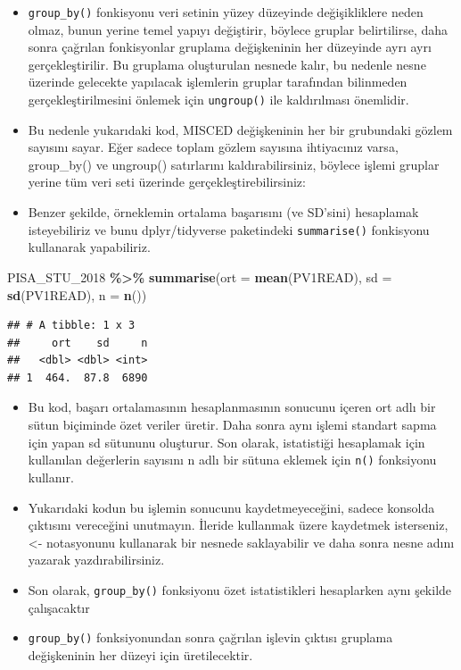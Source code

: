 \documentclass[
  oneside]{book}
\newenvironment{Shaded}{\begin{snugshade}}{\end{snugshade}}
\newcommand{\AttributeTok}[1]{\textcolor[rgb]{0.13,0.29,0.53}{#1}}
\newcommand{\FunctionTok}[1]{\textcolor[rgb]{0.13,0.29,0.53}{\textbf{#1}}}
\newcommand{\NormalTok}[1]{#1}
\newcommand{\SpecialCharTok}[1]{\textcolor[rgb]{0.81,0.36,0.00}{\textbf{#1}}}
\begin{document}
\begin{itemize}
\item
  \texttt{group\_by()} fonkisyonu veri setinin yüzey düzeyinde değişikliklere neden olmaz, bunun yerine temel yapıyı değiştirir, böylece gruplar belirtilirse, daha sonra çağrılan fonkisyonlar gruplama değişkeninin her düzeyinde ayrı ayrı gerçekleştirilir. Bu gruplama oluşturulan nesnede kalır, bu nedenle nesne üzerinde gelecekte yapılacak işlemlerin gruplar tarafından bilinmeden gerçekleştirilmesini önlemek için \texttt{ungroup()} ile kaldırılması önemlidir.
\item
  Bu nedenle yukarıdaki kod, MISCED değişkeninin her bir grubundaki gözlem sayısını sayar. Eğer sadece toplam gözlem sayısına ihtiyacınız varsa, group\_by() ve ungroup() satırlarını kaldırabilirsiniz, böylece işlemi gruplar yerine tüm veri seti üzerinde gerçekleştirebilirsiniz:
\item
  Benzer şekilde, örneklemin ortalama başarısını (ve SD'sini) hesaplamak isteyebiliriz ve bunu dplyr/tidyverse paketindeki \texttt{summarise()} fonkisyonu kullanarak yapabiliriz.
\end{itemize}

\begin{Shaded}
\begin{Highlighting}[]
\NormalTok{PISA\_STU\_2018 }\SpecialCharTok{\%\textgreater{}\%}
  \FunctionTok{summarise}\NormalTok{(}\AttributeTok{ort =} \FunctionTok{mean}\NormalTok{(PV1READ),}
            \AttributeTok{sd =} \FunctionTok{sd}\NormalTok{(PV1READ),}
            \AttributeTok{n =} \FunctionTok{n}\NormalTok{())}
\end{Highlighting}
\end{Shaded}

\begin{verbatim}
## # A tibble: 1 x 3
##     ort    sd     n
##   <dbl> <dbl> <int>
## 1  464.  87.8  6890
\end{verbatim}

\begin{itemize}
\item
  Bu kod, başarı ortalamasının hesaplanmasının sonucunu içeren ort adlı bir sütun biçiminde özet veriler üretir. Daha sonra aynı işlemi standart sapma için yapan sd sütununu oluşturur. Son olarak, istatistiği hesaplamak için kullanılan değerlerin sayısını n adlı bir sütuna eklemek için \texttt{n()} fonksiyonu kullanır.
\item
  Yukarıdaki kodun bu işlemin sonucunu kaydetmeyeceğini, sadece konsolda çıktısını vereceğini unutmayın. İleride kullanmak üzere kaydetmek isterseniz, \textless- notasyonunu kullanarak bir nesnede saklayabilir ve daha sonra nesne adını yazarak yazdırabilirsiniz.
\item
  Son olarak, \texttt{group\_by()} fonksiyonu özet istatistikleri hesaplarken aynı şekilde çalışacaktır
\item
  \texttt{group\_by()} fonksiyonundan sonra çağrılan işlevin çıktısı gruplama değişkeninin her düzeyi için üretilecektir.
\end{itemize}
\end{document}
